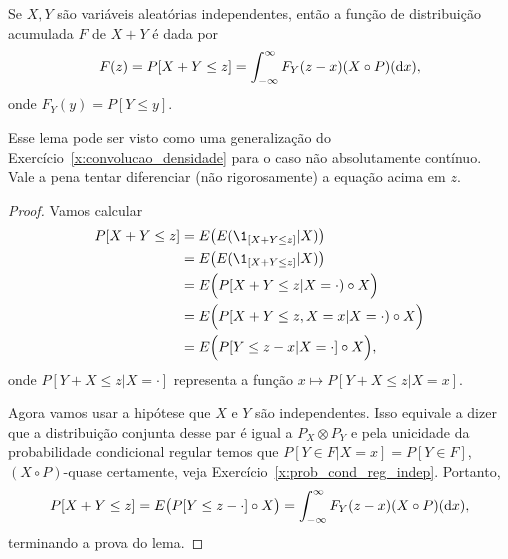 \documentclass[../Notas_de_aula.tex]{subfiles}
\begin{document}
\begin{lemma}
  Se $X, Y$ são variáveis aleatórias independentes, então a função de distribuição acumulada $F$ de $X + Y$ é dada por
  \begin{equation}
    F(z) = P[X + Y \leq z] = \int_{-\infty}^\infty F_Y(z - x) (X \circ P) (\mathop{}\!\mathrm{d} x),
  \end{equation}
  onde $F_Y(y) = P[Y \leq y]$.
\end{lemma}

Esse lema pode ser visto como uma generalização do Exercício~\ref{x:convolucao_densidade} para o caso não absolutamente contínuo.
Vale a pena tentar diferenciar (não rigorosamente) a equação acima em $z$.

\begin{proof}
  Vamos calcular
  \begin{equation}
    \begin{split}
      P[X + Y \leq z] & = E\big( E(\1_{[X + Y \leq z]} | X) \big)\\
      & = E\big( E(\1_{[X + Y \leq z]} | X) \big)\\
      & = E\Big( P[X + Y \leq z| X = \cdot) \circ X \Big)\\
      & = E\Big( P[X + Y \leq z, X = x| X = \cdot) \circ X \Big)\\
      & = E\Big( P[Y \leq z - x| X = \cdot] \circ X \Big),
    \end{split}
  \end{equation}
  onde $P[Y + X \leq z| X = \cdot]$ representa a função $x \mapsto P[Y + X \leq z | X = x]$.

  Agora vamos usar a hipótese que $X$ e $Y$ são independentes.
  Isso equivale a dizer que a distribuição conjunta desse par é igual a $P_X \otimes P_Y$ e pela unicidade da probabilidade condicional regular temos que $P[Y \in F | X = x] = P[Y \in F]$, $(X \circ P)$-quase certamente, veja Exercício~\ref{x:prob_cond_reg_indep}.
  Portanto,
  \begin{equation}
    P[X + Y \leq z] = E\big( P[Y \leq z - \cdot] \circ X \big) = \int_{-\infty}^\infty F_Y(z - x) (X \circ P) (\mathop{}\!\mathrm{d} x),
  \end{equation}
  terminando a prova do lema.
\end{proof}
\end{document}
